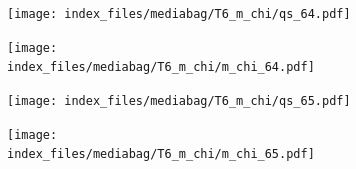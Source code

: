 \documentclass[
  11pt,
  letterpaper,
]{scrreprt}
\begin{document}
\begin{figure}

\begin{minipage}{0.50\linewidth}

\begin{figure}[H]

{\centering \texttt{[image: index\_files/mediabag/T6\_m\_chi/qs\_64.pdf]}

}


\end{figure}%

\end{minipage}%
%
\begin{minipage}{0.50\linewidth}

\begin{figure}[H]

{\centering \texttt{[image: index\_files/mediabag/T6\_m\_chi/m\_chi\_64.pdf]}

}


\end{figure}%

\end{minipage}%

\end{figure}%

\begin{figure}

\begin{minipage}{0.50\linewidth}

\begin{figure}[H]

{\centering \texttt{[image: index\_files/mediabag/T6\_m\_chi/qs\_65.pdf]}

}


\end{figure}%

\end{minipage}%
%
\begin{minipage}{0.50\linewidth}

\begin{figure}[H]

{\centering \texttt{[image: index\_files/mediabag/T6\_m\_chi/m\_chi\_65.pdf]}

}


\end{figure}%

\end{minipage}%

\end{figure}%
\end{document}
